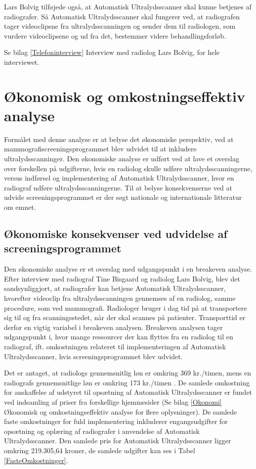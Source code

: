 Lars Bolvig tilføjede også, at Automatisk Ultralydsscanner skal kunne betjenes af radiografer. Så Automatisk Ultralydsscanner skal fungerer ved, at radiografen tager videoclipsne fra ultralydsscanningen og sender dem til radiologen, som vurdere videoclipsene og ud fra det, bestemmer videre behandlingsforløb.

Se bilag \ref{Telefoninterview} Interview med radiolog Lars Bolvig, for hele interviewet. 

\section{Økonomisk og omkostningseffektiv analyse}
Formålet med denne analyse er at belyse det økonomiske perspektiv, ved at mammografiscreeningsprogrammet blev udvidet til at inkludere ultralydsscanninger. Den økonomiske analyse er udført ved at lave et overslag over forskellen på udgifterne, hvis en radiolog skulle udføre ultralydsscanningerne, versus indførsel og implementering af Automatisk Ultralydsscanner, hvor en radiograf udføre ultralydsscanningerne. Til at belyse konsekvenserne ved at udvide screeningsprogrammet er der søgt nationale og internationale litteratur om emnet. 

\subsection{Økonomiske konsekvenser ved udvidelse af screeningsprogrammet} 
Den økonomiske analyse er et overslag med udgangspunkt i en breakeven analyse. Efter interview med radiograf Tine Bisgaard og radiolog Lars Bolvig, blev det sandsynliggjort, at radiografer kan betjene Automatisk Ultralydsscanner, hvorefter videoclip fra ultralydsscanningen gennemses af en radiolog, samme procedure, som ved mammografi. 
Radiologer bruger i dag tid på at transportere sig til og fra scanningsstedet, når der skal scannes på patienter. Transporttid er derfor en vigtig variabel i breakeven analysen. Breakeven analysen tager udgangspunkt i, hvor mange ressourcer der kan flyttes fra en radiolog til en radiograf, ift. omkostningen relateret til implementeringen af Automatisk Ultralydsscanner, hvis screeningsprogrammet blev udvidet. 

Det er antaget, at radiologs gennemsnitlig løn er omkring 369 kr./timen, mens en radiografs gennemsnitlige løn er omkring 173 kr./timen \cite{Lon}. De samlede omkostning for anskaffelse af udstyret til opsætning af Automatisk Ultralydsscanner er fundet ved indsamling af priser fra forskellige hjemmesider (Se bilag \ref{Okonomi} Økonomisk og omkostningseffektiv analyse for flere oplysninger). De samlede faste omkostninger for fuld implementering inkluderer engangsudgifter for opsætning og oplæring af radiografer i anvendelse af Automatisk Ultralydsscanner. Den samlede pris for Automatisk Ultralydsscanner ligger omkring 219.305,64 kroner, de samlede udgifter kan ses i Tabel \ref{FasteOmkostninger}. 

